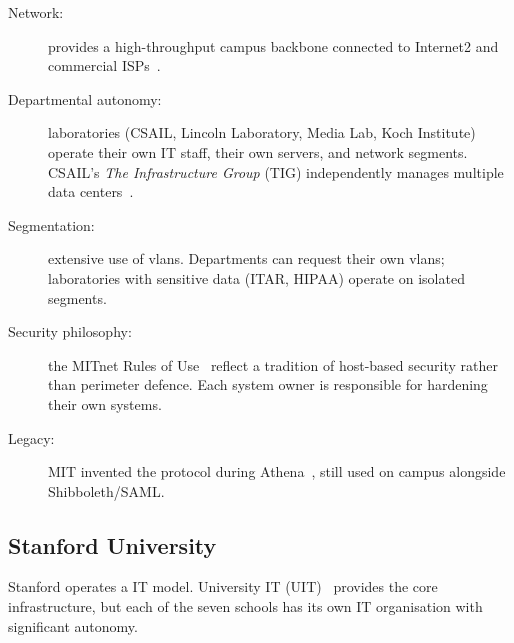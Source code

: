 \begin{description}
    \item[Network:]  provides a high-throughput
    campus backbone connected to Internet2 and commercial
    ISPs~\cite{mit-facts}.
    \item[Departmental autonomy:] laboratories (CSAIL, Lincoln
    Laboratory, Media Lab, Koch Institute) operate their own IT staff,
    their own servers, and network segments. CSAIL's
    \emph{The Infrastructure Group}
    (TIG) independently manages multiple data
    centers~\cite{mit-csail-tig}.
    \item[Segmentation:] extensive use of \gls{vlan}s. Departments can request
    their own \gls{vlan}s; laboratories with sensitive data (ITAR, HIPAA)
    operate on isolated segments.
    \item[Security philosophy:] the MITnet Rules of
    Use~\cite{mit-network-rules} reflect a tradition of host-based
    security rather than perimeter defence. Each system owner is
    responsible for hardening their own systems.
    \item[Legacy:] MIT invented the  protocol during
    Athena~\cite{mit-kerberos}, still used on campus alongside
    Shibboleth/SAML.
\end{description}

\subsection{Stanford University}

Stanford operates a  IT model. University IT
(UIT)~\cite{stanford-uit} provides the core infrastructure, but each of
the seven schools has its own IT organisation with significant autonomy.


